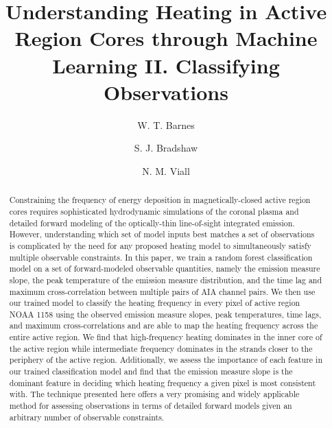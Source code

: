 \documentclass[modern,linenumbers,longauthor]{aastex63}
\newcommand{\AR}{active region}
\begin{document}
\title{Understanding Heating in Active Region Cores through Machine Learning II. Classifying Observations}
\author[0000-0001-9642-6089]{W. T. Barnes}
\author[0000-0002-3300-6041]{S. J. Bradshaw}
\author[0000-0003-1692-1704]{N. M. Viall}

\begin{abstract}
Constraining the frequency of energy deposition in magnetically-closed \AR{} cores requires sophisticated hydrodynamic simulations of the coronal plasma and detailed forward modeling of the optically-thin line-of-sight integrated emission.
However, understanding which set of model inputs best matches a set of observations is complicated by the need for any proposed heating model to simultaneously satisfy multiple observable constraints.
In this paper, we train a random forest classification model on a set of forward-modeled observable quantities, namely the emission measure slope, the peak temperature of the emission measure distribution, and the time lag and maximum cross-correlation between multiple pairs of AIA channel pairs.
We then use our trained model to classify the heating frequency in every pixel of \AR{} NOAA 1158 using the observed emission measure slopes, peak temperatures, time lags, and maximum cross-correlations and are able to map the heating frequency across the entire active region.
We find that high-frequency heating dominates in the inner core of the \AR{} while intermediate frequency dominates in the strands closer to the periphery of the \AR{}.
Additionally, we assess the importance of each feature in our trained classification model and find that the emission measure slope is the dominant feature in deciding which heating frequency a given pixel is most consistent with.
The technique presented here offers a very promising and widely applicable method for assessing observations in terms of detailed forward models given an arbitrary number of observable constraints.
\end{abstract}
\end{document}
